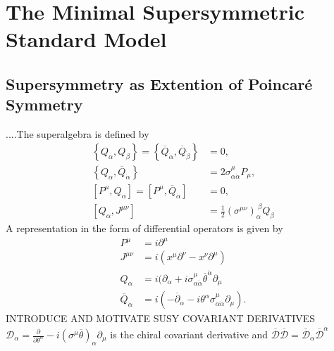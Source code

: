 \section{The Minimal Supersymmetric Standard Model}


\subsection{Supersymmetry as Extention of Poincaré Symmetry}\label{sec:SUSYalgebra}
....The superalgebra is defined by
\begin{align}
\left\{Q_\alpha,Q_\beta\right\} = \left\{\overline{Q}_{\dot{\alpha}},\overline{Q}_{\dot{\beta}}\right\} &= 0,  \nonumber\\
\left\{Q_\alpha,\overline{Q}_{\dot{\alpha}}\right\} &= 2\sigma^\mu_{\alpha\dot{\alpha}} P_\mu, \nonumber\\
[P^\mu,Q_\alpha] = [P^\mu,\overline{Q}_{\dot{\alpha}}] &= 0, \nonumber \\
[Q_\alpha, J^{\mu\nu}] &= \frac{1}{2} (\sigma^{\mu\nu})_\alpha^{\ \beta} Q_\beta
\end{align}
A representation in the form of differential operators is given by
\begin{align}
P^\mu &= i\partial^\mu\nonumber\\
J^{\mu\nu} &= i(x^\mu\partial^\nu - x^\nu\partial^\mu)\nonumber\\
Q_\alpha &= i(\partial_\alpha + i\sigma^\mu_{\alpha\dot{\alpha}}\overline{\theta}^{\dot{\alpha}}\partial_\mu\nonumber\\
\overline{Q}_{\dot{\alpha}} &= i(-\overline{\partial}_{\dot{\alpha}} - i \theta^\alpha \sigma^\mu_{\alpha\dot{\alpha}}\partial_\mu).
\end{align}
INTRODUCE AND MOTIVATE SUSY COVARIANT DERIVATIVES $\mathcal{D}_\alpha = \frac{\partial}{\partial \theta^\alpha} - i(\sigma^\mu\overline{\theta})_\alpha\partial_\mu$ is the chiral covariant derivative and $\overline{\mathcal{D}}\overline{\mathcal{D}} = \overline{\mathcal{D}}_{\dot{\alpha}}\overline{\mathcal{D}}^{\dot{\alpha}}$

